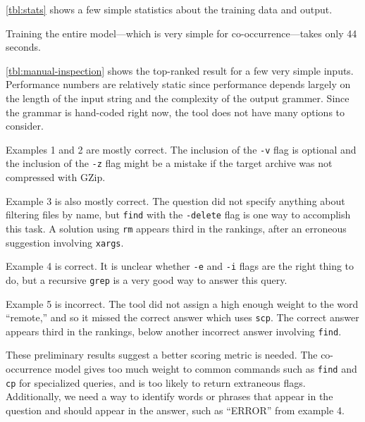 \autoref{tbl:stats} shows a few simple statistics about the training data and
output.

Training the entire model---which is very simple for co-occurrence---takes only
44 seconds.

\autoref{tbl:manual-inspection} shows the top-ranked result for a few very
simple inputs. Performance numbers are relatively static since performance
depends largely on the length of the input string and the complexity of the
output grammer. Since the grammar is hand-coded right now, the tool does not
have many options to consider.

Examples 1 and 2 are mostly correct. The inclusion of the \texttt{-v} flag is
optional and the inclusion of the \texttt{-z} flag might be a mistake if the
target archive was not compressed with GZip.

Example 3 is also mostly correct. The question did not specify anything about
filtering files by name, but \texttt{find} with the \texttt{-delete} flag is
one way to accomplish this task. A solution using \texttt{rm} appears third in
the rankings, after an erroneous suggestion involving \texttt{xargs}.

Example 4 is correct. It is unclear whether \texttt{-e} and \texttt{-i} flags
are the right thing to do, but a recursive \texttt{grep} is a very good way to
answer this query.

Example 5 is incorrect. The tool did not assign a high enough weight to the word
``remote,'' and so it missed the correct answer which uses \texttt{scp}. The
correct answer appears third in the rankings, below another incorrect answer
involving \texttt{find}.

These preliminary results suggest a better scoring metric is needed. The
co-occurrence model gives too much weight to common commands such as
\texttt{find} and \texttt{cp} for specialized queries, and is too likely to
return extraneous flags. Additionally, we need a way to identify words or
phrases that appear in the question and should appear in the answer, such as
``ERROR'' from example 4.


